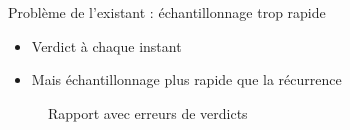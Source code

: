 \documentclass{beamer}
\begin{document}
	\begin{frame}{\normalsize Problème de l'existant : échantillonnage trop rapide}
	\begin{itemize}
		\item Verdict à chaque instant
		\item Mais échantillonnage plus rapide que la récurrence
	\end{itemize}
\begin{figure}
\centering
{}
\caption{Rapport avec erreurs de verdicts}
\label{fig:badReport}
\end{figure}
	\end{frame}
\end{document}
